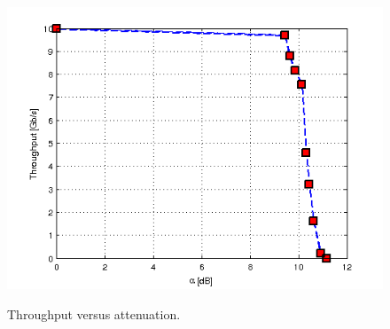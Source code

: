\documentclass[a4paper,10pt]{report}
\begin{document}
\begin{figure}[!ht]
   \centering
   \includegraphics[width=12cm]{throughput.png}\\
   \caption{Throughput versus attenuation.}
   \label{throughput}
\end{figure}
\end{document}
